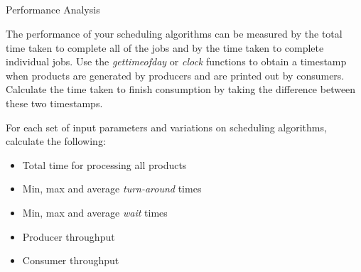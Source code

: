 \documentclass[11pt, letterpaper]{article}
\begin{document}
\\
\\
\noindent{\today}\\
\\

\bigskip
\noindent\Large{Performance Analysis}

The performance of your scheduling algorithms can be measured by the total time taken to complete all of the jobs and by the time taken to complete individual jobs. Use the \textit{gettimeofday} or \textit{clock} functions to obtain a timestamp when products are generated by producers and are printed out by consumers. Calculate the time taken to finish consumption by taking the difference between these two timestamps.

For each set of input parameters and variations on scheduling algorithms, calculate the following:
\begin{itemize}
    \item Total time for processing all products
    \item Min, max and average \textit{turn-around} times
    \item Min, max and average \textit{wait} times
    \item Producer throughput
    \item Consumer throughput
\end{itemize}
\end{document}
